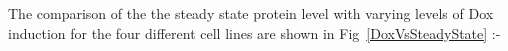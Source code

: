 \documentclass{article}
\begin{document}
The comparison of the the steady state protein level with varying levels of Dox induction for the four different cell lines are shown in Fig~\ref{DoxVsSteadyState} :- 
\pagebreak

\begin{figure}[h!]
\centering
{}

\end{figure}
\end{document}
